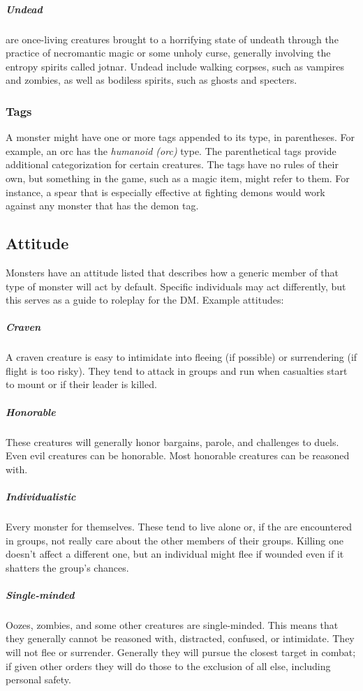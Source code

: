 \subparagraph*{Undead} are once-living creatures brought to a horrifying state of undeath through the practice of necromantic magic or some unholy curse, generally involving the entropy spirits called jotnar. Undead include walking corpses, such as vampires and zombies, as well as bodiless spirits, such as ghosts and specters.

\subsubsection{Tags}

A monster might have one or more tags appended to its type, in parentheses. For example, an orc has the \textit{humanoid (orc)} type. The parenthetical tags provide additional categorization for certain creatures. The tags have no rules of their own, but something in the game, such as a magic item, might refer to them. For instance, a spear that is especially effective at fighting demons would work against any monster that has the demon tag.

\subsection{Attitude}

Monsters have an attitude listed that describes how a generic member of that type of monster will act by default. Specific individuals may act differently, but this serves as a guide to roleplay for the DM. Example attitudes:

\subparagraph*{Craven} A craven creature is easy to intimidate into fleeing (if possible) or surrendering (if flight is too risky). They tend to attack in groups and run when casualties start to mount or if their leader is killed.

\subparagraph*{Honorable} These creatures will generally honor bargains, parole, and challenges to duels. Even evil creatures can be honorable. Most honorable creatures can be reasoned with.

\subparagraph*{Individualistic} Every monster for themselves. These tend to live alone or, if the are encountered in groups, not really care about the other members of their groups. Killing one doesn't affect a different one, but an individual might flee if wounded even if it shatters the group's chances.

\subparagraph*{Single-minded} Oozes, zombies, and some other creatures are single-minded. This means that they generally cannot be reasoned with, distracted, confused, or intimidate. They will not flee or surrender. Generally they will pursue the closest target in combat; if given other orders they will do those to the exclusion of all else, including personal safety.

